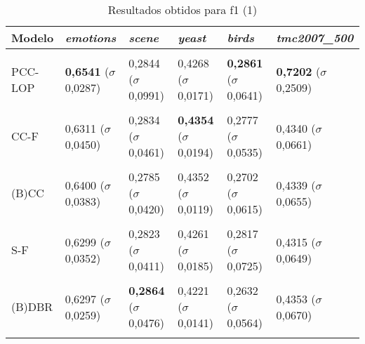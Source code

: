\begin{table}[htbp]
	\centering
	\caption{Resultados obtidos para f1 (1)}
		\begin{tabular}
        { p{0.88in} p{0.88in} p{0.88in} p{0.88in} p{0.88in} p{0.88in} }
        
        \hline
Modelo & \textit{emotions} & \textit{scene} & \textit{yeast} & \textit{birds} & \textit{tmc2007\_500} \\ 
\hline \\

PCC-LOP & \textbf{0,6541} \newline ($\sigma$ 0,0287) & 0,2844 \newline ($\sigma$ 0,0991) & 0,4268 \newline ($\sigma$ 0,0171) & \textbf{0,2861} \newline ($\sigma$ 0,0641) & \textbf{0,7202} \newline ($\sigma$ 0,2509) \\ \\
CC-F & 0,6311 \newline ($\sigma$ 0,0450) & 0,2834 \newline ($\sigma$ 0,0461) & \textbf{0,4354} \newline ($\sigma$ 0,0194) & 0,2777 \newline ($\sigma$ 0,0535) & 0,4340 \newline ($\sigma$ 0,0661) \\ \\
(B)CC & 0,6400 \newline ($\sigma$ 0,0383) & 0,2785 \newline ($\sigma$ 0,0420) & 0,4352 \newline ($\sigma$ 0,0119) & 0,2702 \newline ($\sigma$ 0,0615) & 0,4339 \newline ($\sigma$ 0,0655) \\ \\
S-F & 0,6299 \newline ($\sigma$ 0,0352) & 0,2823 \newline ($\sigma$ 0,0411) & 0,4261 \newline ($\sigma$ 0,0185) & 0,2817 \newline ($\sigma$ 0,0725) & 0,4315 \newline ($\sigma$ 0,0649) \\ \\
(B)DBR & 0,6297 \newline ($\sigma$ 0,0259) & \textbf{0,2864} \newline ($\sigma$ 0,0476) & 0,4221 \newline ($\sigma$ 0,0141) & 0,2632 \newline ($\sigma$ 0,0564) & 0,4353 \newline ($\sigma$ 0,0670) \\ \\

\end{tabular}
\end{table}
